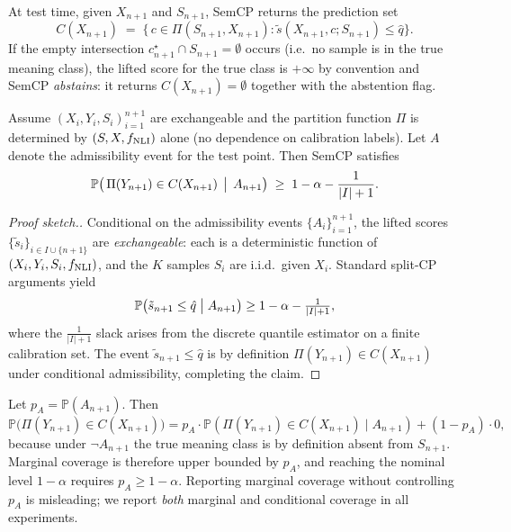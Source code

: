 At test time, given $X_{n+1}$ and $S_{n+1}$, SemCP returns the prediction
set
\[
  C(X_{n+1}) \;=\; \bigl\{\, c \in \Pi(S_{n+1}, X_{n+1})
                 : \tilde{s}(X_{n+1}, c; S_{n+1}) \le \hat{q} \bigr\}.
\]
If the empty intersection $c_{n+1}^\star \cap S_{n+1} = \emptyset$ occurs
(i.e.\ no sample is in the true meaning class), the lifted score for the
true class is $+\infty$ by convention and SemCP \emph{abstains}: it returns
$C(X_{n+1}) = \emptyset$ together with the abstention flag.

\begin{theorem}
\label{thm:conditional}
Assume $(X_i, Y_i, S_i)_{i=1}^{n+1}$ are exchangeable and the partition
function $\Pi$ is determined by $(S, X, f_{\rm NLI})$ alone (no dependence
on calibration labels). Let $A$ denote the admissibility event for the test
point. Then SemCP satisfies
\[
   \mathbb{P}\bigl(\,\Pi(Y_{n+1}) \in C(X_{n+1})\,\bigm|\, A_{n+1} \bigr)
   \;\ge\; 1 - \alpha - \frac{1}{|I|+1}.
\]
\end{theorem}

\begin{proof}[Proof sketch.]
Conditional on the admissibility events $\{A_i\}_{i=1}^{n+1}$, the lifted
scores $\{\tilde{s}_i\}_{i \in I \cup \{n+1\}}$ are \emph{exchangeable}:
each is a deterministic function of $(X_i, Y_i, S_i, f_{\rm NLI})$, and
the $K$ samples $S_i$ are i.i.d.\ given $X_i$. Standard split-CP
arguments \citep{angelopoulos2021gentle, vovk2005algorithmic} yield
\[
   \mathbb{P}\bigl(\tilde{s}_{n+1} \le \hat{q}\bigm| A_{n+1}\bigr)
   \ge 1 - \alpha - \tfrac{1}{|I|+1},
\]
where the $\tfrac{1}{|I|+1}$ slack arises from the discrete quantile
estimator on a finite calibration set. The event
$\tilde{s}_{n+1} \le \hat{q}$ is by definition $\Pi(Y_{n+1}) \in C(X_{n+1})$
under conditional admissibility, completing the claim.
\end{proof}

\begin{remark}
\label{rem:marginal}
Let $p_A = \mathbb{P}(A_{n+1})$. Then
\(
  \mathbb{P}\bigl(\Pi(Y_{n+1}) \in C(X_{n+1})\bigr)
  = p_A \cdot \mathbb{P}(\Pi(Y_{n+1}) \in C(X_{n+1}) \mid A_{n+1})
  + (1-p_A) \cdot 0,
\)
because under $\neg A_{n+1}$ the true meaning class is by definition
absent from $S_{n+1}$. Marginal coverage is therefore upper bounded by
$p_A$, and reaching the nominal level $1 - \alpha$ requires
$p_A \ge 1 - \alpha$. Reporting marginal coverage without controlling
$p_A$ is misleading; we report \emph{both} marginal and conditional
coverage in all experiments.
\end{remark}

